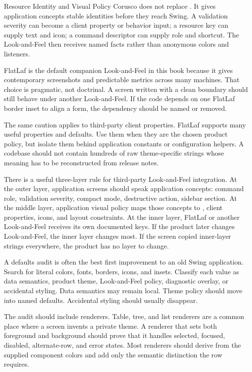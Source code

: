 \begin{coruscobox}{Resource Identity and Visual Policy}
Corusco does not replace . It gives application concepts stable identities before they reach Swing. A validation severity can become a client property or behavior input; a resource key can supply text and icon; a command descriptor can supply role and shortcut. The Look-and-Feel then receives named facts rather than anonymous colors and listeners.
\end{coruscobox}

FlatLaf is the default companion Look-and-Feel in this book because it gives contemporary screenshots and predictable metrics across many machines. That choice is pragmatic, not doctrinal. A screen written with a clean boundary should still behave under another Look-and-Feel. If the code depends on one FlatLaf border inset to align a form, the dependency should be named or removed.

The same caution applies to third-party client properties. FlatLaf supports many useful properties and defaults. Use them when they are the chosen product policy, but isolate them behind application constants or configuration helpers. A codebase should not contain hundreds of raw theme-specific strings whose meaning has to be reconstructed from release notes.

There is a useful three-layer rule for third-party Look-and-Feel integration. At the outer layer, application screens should speak application concepts: command role, validation severity, compact mode, destructive action, sidebar section. At the middle layer, application visual policy maps those concepts to , client properties, icons, and layout constraints. At the inner layer, FlatLaf or another Look-and-Feel receives its own documented keys. If the product later changes Look-and-Feel, the inner layer changes most. If the screen copied inner-layer strings everywhere, the product has no layer to change.

A defaults audit is often the best first improvement to an old Swing application. Search for literal colors, fonts, borders, icons, and insets. Classify each value as data semantics, product theme, Look-and-Feel policy, diagnostic overlay, or accidental styling. Data semantics may remain local. Theme policy should move into named defaults. Accidental styling should usually disappear.

The audit should include renderers. Table, tree, and list renderers are a common place where a screen invents a private theme. A renderer that sets both foreground and background should prove that it handles selected, focused, disabled, alternate-row, and error states. Most renderers should derive from the supplied component colors and add only the semantic distinction the row requires.

